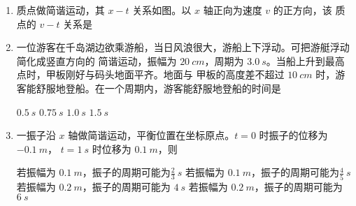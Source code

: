 \begin{enumerate}
\pfourchoices
{}
{}
{}
{}



\item 
{}
质点做简谐运动，其 $ x-t $ 关系如图。以 $ x $ 轴正向为速度 $ v $ 的正方向，该
质点的 $ v-t $ 关系是  
\begin{figure}[h!]
	\centering
	
\end{figure}


\pfourchoices
{}
{}
{}
{}


\item 
{}
一位游客在千岛湖边欲乘游船，当日风浪很大，游船上下浮动。可把游艇浮动简化成竖直方向的
简谐运动，振幅为 $ 20 \ cm $，周期为 $ 3.0 \ s $。当船上升到最高点时，甲板刚好与码头地面平齐。地面与
甲板的高度差不超过 $ 10 \ cm $ 时，游客能舒服地登船。在一个周期内，游客能舒服地登船的时间是  

\fourchoices
{$ 0.5 \ s $}
{$ 0.75 \ s $}
{$ 1.0 \ s $}
{$ 1.5 \ s $}



\item 
{}
一振子沿 $ x $ 轴做简谐运动，平衡位置在坐标原点。$ t=0 $ 时振子的位移为$ -0.1 \ m $，
$ t=1 \ s $ 时位移为 $ 0.1 \ m $，则  


\fourchoices
{若振幅为 $ 0.1 \ m $，振子的周期可能为$ \frac{ 2 }{ 3 } \ s $}
{若振幅为 $ 0.1 \ m $，振子的周期可能为$ \frac{ 4 }{ 5 } \ s $}
{若振幅为 $ 0.2 \ m $，振子的周期可能为 $ 4 \ s $}
{若振幅为 $ 0.2 \ m $，振子的周期可能为 $ 6 \ s $}





	
	
	
\end{enumerate}

